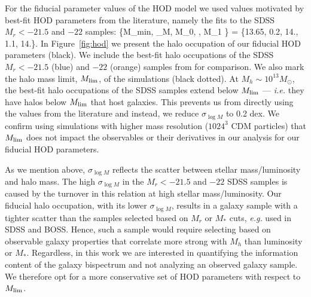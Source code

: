 For the fiducial parameter values of the HOD model we used values motivated by 
best-fit HOD parameters from the literature, namely the \cite{zheng2007} 
fits to the SDSS $M_r < -21.5$  and $-22$ samples: 
\beq \label{eq:hod_fid}
\{M_{\rm min}, \sigma_{\log M}, \log M_0, \alpha, \log M_1 \} = \{13.65, 0.2, 14., 1.1, 14.\}.
\eeq
In Figure~\ref{fig:hod} we present the halo occupation of our fiducial 
HOD parameters (black). We include the best-fit halo occupations of 
the SDSS $M_r < -21.5$ (blue)  and $-22$ (orange) samples from \cite{zheng2007}
for comparison. We also mark the halo mass limit, $M_{\rm lim}$, of the \quij 
simulations (black dotted). At $M_h \sim 10^{13} M_\odot$, the best-fit halo 
occupations of the SDSS samples extend below $M_{\rm lim}$ --- \emph{i.e.} 
they have halos below $M_{\rm lim}$ that host galaxies. This prevents us from 
directly using the values from the literature and instead, we reduce 
$\sigma_{\log M}$ to 0.2 dex. We confirm using \quij simulations with higher 
mass resolution ($1024^3$ CDM particles) that $M_{\rm lim}$ does not impact
the observables or their derivatives in our analysis for our fiducial HOD 
parameters. 

As we mention above, $\sigma_{\log M}$ reflects the scatter between stellar 
mass/luminosity and halo mass. The high $\sigma_{\log M}$ in the $M_r < -21.5$ 
and $-22$ SDSS samples is caused by the turnover in this relation at high stellar 
mass/luminosity. Our fiducial halo occupation, with its lower $\sigma_{\log M}$, 
results in a galaxy sample with a tighter scatter than the samples selected based 
on $M_r$ or $M_*$ cuts, \emph{e.g.} used in SDSS and BOSS. Hence, such a sample
would require selecting based on observable galaxy properties that correlate 
more strong with $M_h$ than luminosity or $M_*$.  Regardless, in this work
we are interested in quantifying the information content of the galaxy bispectrum 
and not analyzing an observed galaxy sample. We therefore opt for a more 
conservative set of HOD parameters with respect to $M_{\rm lim}$. 



